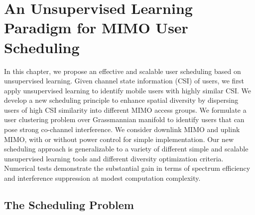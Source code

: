 \chapter{An Unsupervised Learning Paradigm for MIMO User Scheduling} \label{usch:chap}



In this chapter, we propose an effective and scalable user scheduling based on unsupervised learning. 
Given channel state information (CSI) of users, we first apply unsupervised learning to identify mobile users with highly similar CSI. 
We develop a new scheduling principle to enhance spatial diversity by dispersing users of high CSI similarity into different MIMO access groups. 
We formulate a user clustering problem over Grassmannian manifold to identify users that can pose strong co-channel interference. 
We consider downlink MIMO and uplink MIMO, with or without power control for simple implementation. 
Our new scheduling approach is generalizable to a variety of different simple and scalable unsupervised learning tools and different diversity optimization criteria. 
Numerical tests demonstrate the substantial gain in terms of spectrum efficiency and interference suppression at modest computation complexity. 


\section{The Scheduling Problem}\label{usch:sec:systemmodel}

